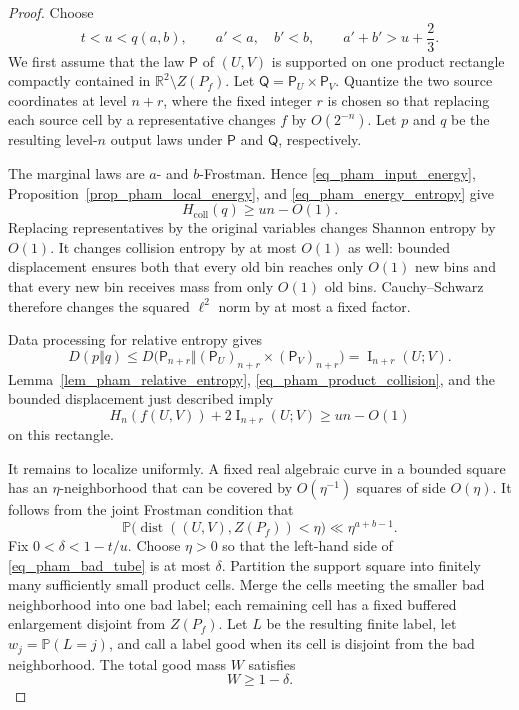 \documentclass[10pt,a4paper]{amsart}
\begin{document}
\begin{proof}
Choose
\[
 t<u<q(a,b),\qquad a'<a,\quad b'<b,
 \qquad a'+b'>u+\frac{2}{3}.
\]
We first assume that the law $\mathsf P$ of $(U,V)$ is supported on one
product rectangle compactly contained in
$\mathbb R^2\setminus Z(P_f)$.  Let
$\mathsf Q=\mathsf P_U\times\mathsf P_V$.  Quantize the
two source coordinates at level $n+r$, where the fixed integer $r$
is chosen so that replacing each source cell by a representative
changes $f$ by $O(2^{-n})$.  Let $p$ and $q$ be the resulting
level-$n$ output laws under $\mathsf P$ and $\mathsf Q$, respectively.

The marginal laws are $a$- and $b$-Frostman.  Hence
\eqref{eq_pham_input_energy},
Proposition~\ref{prop_pham_local_energy}, and
\eqref{eq_pham_energy_entropy} give
\begin{equation}
 H_{\mathrm{coll}}(q)\geq u n-O(1).
 \label{eq_pham_product_collision}
\end{equation}
Replacing representatives by the original variables changes Shannon
entropy by $O(1)$.  It changes collision entropy by at most $O(1)$ as
well: bounded displacement ensures both that every old bin reaches
only $O(1)$ new bins and that every new bin receives mass from only
$O(1)$ old bins.  Cauchy--Schwarz therefore changes the squared
$\ell^2$ norm by at most a fixed factor.

Data processing for relative entropy gives
\begin{equation}
 D(p\Vert q)
 \leq D\big(\mathsf P_{n+r}\Vert
       (\mathsf P_U)_{n+r}\times(\mathsf P_V)_{n+r}\big)
 =\operatorname{I}_{n+r}(U;V).
 \label{eq_pham_data_processing}
\end{equation}
Lemma~\ref{lem_pham_relative_entropy},
\eqref{eq_pham_product_collision}, and the bounded displacement just
described imply
\begin{equation}
 H_n(f(U,V))+2\operatorname{I}_{n+r}(U;V)
 \geq u n-O(1)
 \label{eq_pham_local_correlation}
\end{equation}
on this rectangle.

It remains to localize uniformly.  A fixed real algebraic curve in a
bounded square has an $\eta$-neighborhood that can be covered by
$O(\eta^{-1})$ squares of side $O(\eta)$.  It follows from the joint
Frostman condition that
\begin{equation}
 \mathbb P\big(\operatorname{dist}((U,V),Z(P_f))<\eta\big)
 \ll \eta^{a+b-1}.
 \label{eq_pham_bad_tube}
\end{equation}
Fix $0<\delta<1-t/u$.  Choose $\eta>0$ so that the left-hand side of
\eqref{eq_pham_bad_tube} is at most $\delta$.  Partition the support
square into finitely many sufficiently small product cells.  Merge
the cells meeting the smaller bad neighborhood into one bad label;
each remaining cell has a fixed buffered enlargement disjoint from
$Z(P_f)$.  Let $L$ be the resulting finite label, let
$w_j=\mathbb P(L=j)$,
and call a label good when its cell is disjoint from the bad
neighborhood.  The total good mass $W$ satisfies
\begin{equation}
 W\geq1-\delta.
 \label{eq_pham_good_mass}
\end{equation}


\end{proof}
\end{document}
